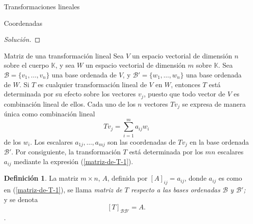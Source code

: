 \documentclass[a4paper,12pt,twoside,spanish,reqno]{amsbook}
\numberwithin{equation}{section}
\theoremstyle{definition}
\newtheorem{definicion}[teorema]{Definici\'on}
\theoremstyle{remark}
\newcommand{\K}{\mathbb K}
\begin{document}
\begin{chapter}{Transformaciones lineales}
\begin{section}{Coordenadas}
\begin{proof}[Solución]
      
\end{proof}
    
    \end{section}



    
        \begin{section}{Matriz de una transformación lineal}\label{seccion-matriz-de-una-tl}
            Sea $V$ un espacio vectorial de dimensión $n$ sobre el cuerpo $\K$, y sea $W$ un espacio vectorial de dimensión $m$ sobre $\K$. Sea $\mathcal B = \{v_1,\ldots,v_n\}$ una base ordenada de $V$, y $\mathcal B' = \{w_1,\ldots,w_n\}$ una base ordenada de $W$. Si $T$ es cualquier 		transformación lineal de $V$ en $W$, entonces $T$ está determinada por su efecto sobre los vectores $v_j$, puesto que todo vector de $V$ es combinación lineal de ellos. Cada uno de los $n$ vectores $Tv_j$ se expresa de manera única 	como combinación lineal
            \begin{equation}\label{matriz-de-T-1}
                Tv_j = \sum_{i=1}^{m} a_{ij} w_i
            \end{equation}
            de los $w_i$. Los escalares $a_{1j},\ldots,a_{mj}$ son las coordenadas de $Tv_j$ en la base ordenada $\mathcal B'$. Por consiguiente, la transformación $T$ está determinada por los
            $mn$ escalares $a_{ij}$ mediante la expresión (\ref{matriz-de-T-1}). 
            
            \begin{definicion}
                La matriz $m \times n$, $A$, definida por $[A]_{ij} = a_{ij}$, donde $a_{ij}$  es como en  (\ref{matriz-de-T-1}), se llama \textit{matriz de $T$ respecto a las bases ordenadas $\mathcal B$ y $\mathcal B'$;} y se denota 
                $$
                [T]_{\mathcal B \mathcal B'} = A .
                $$.
            \end{definicion}
            

\end{section}
\end{chapter}
\end{document}
